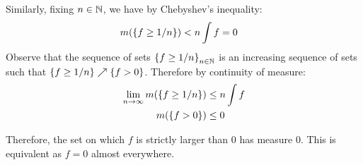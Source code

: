 \begin{prf*}
Similarly, fixing $n\in \mathbb{N}$, we have by Chebyshev's inequality: 
\begin{align*}
	m(\qty{f\geq 1/n}) &< n\int f = 0
\end{align*}
Observe that the sequence of sets $\qty{f\geq 1/n}_{n\in \mathbb{N}}$ is an increasing sequence of sets such that $\qty{f\geq 1/n} \nearrow \qty{f>0}$. Therefore by continuity of measure: 
\begin{align*}
	\lim_{n\to\infty} m\qty(\qty{f\geq 1/n}) &\leq n\int f\\
	 m\qty(\qty{f>0}) &\leq 0
\end{align*}

Therefore, the set on which $f$ is strictly larger than 0 has measure 0. This is equivalent as $f = 0$ almost everywhere. 

\end{prf*}


